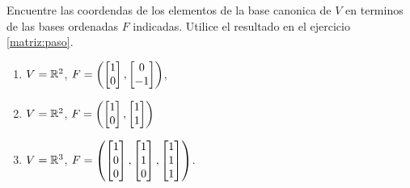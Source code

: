 \begin{problema}
 Encuentre las coordendas de los elementos de la base canonica de $V$ en terminos de las bases ordenadas $F$ indicadas.
Utilice el resultado en el ejercicio \ref{matriz:paso}.
 \begin{enumerate}
  \item $V=\mathbb{R}^{2}$, $F=\left(\begin{bmatrix}1\\0\end{bmatrix},\begin{bmatrix}0\\-1\end{bmatrix}\right)$,
  \item $V=\mathbb{R}^{2}$, $F=\left(\begin{bmatrix}1\\0\end{bmatrix},\begin{bmatrix}1\\1\end{bmatrix}\right)$
  \item $V=\mathbb{R}^{3}$, $F=\left(\begin{bmatrix}1\\0\\0\end{bmatrix},\begin{bmatrix}1\\1\\0\end{bmatrix},\begin{bmatrix}1\\1\\1\end{bmatrix}\right)$.
 \end{enumerate} 
\end{problema}

